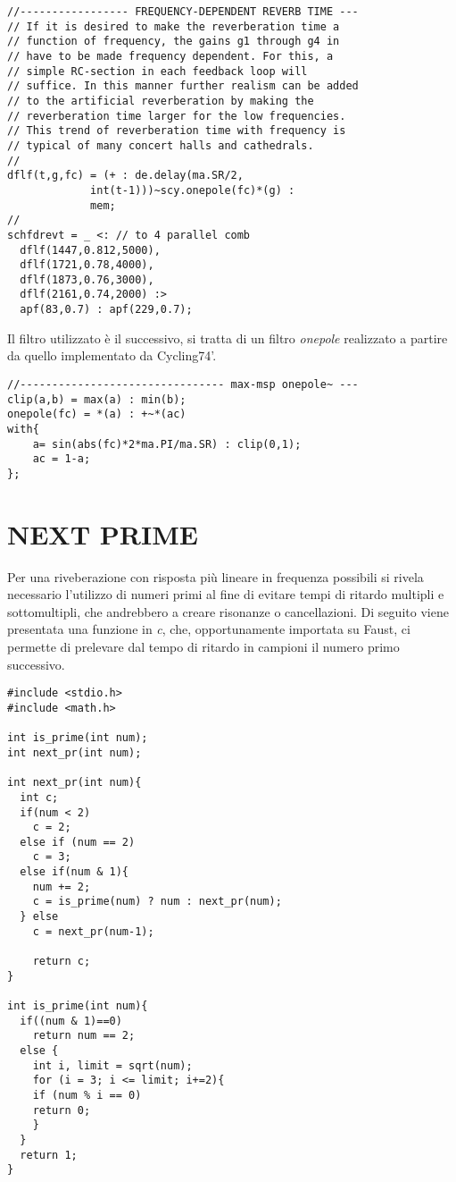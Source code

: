 \begin{lstlisting}
//----------------- FREQUENCY-DEPENDENT REVERB TIME ---
// If it is desired to make the reverberation time a
// function of frequency, the gains g1 through g4 in
// have to be made frequency dependent. For this, a
// simple RC-section in each feedback loop will
// suffice. In this manner further realism can be added
// to the artificial reverberation by making the
// reverberation time larger for the low frequencies.
// This trend of reverberation time with frequency is
// typical of many concert halls and cathedrals.
//
dflf(t,g,fc) = (+ : de.delay(ma.SR/2,
             int(t-1)))~scy.onepole(fc)*(g) :
             mem;
//
schfdrevt = _ <: // to 4 parallel comb
  dflf(1447,0.812,5000),
  dflf(1721,0.78,4000),
  dflf(1873,0.76,3000),
  dflf(2161,0.74,2000) :>
  apf(83,0.7) : apf(229,0.7);
\end{lstlisting}

Il filtro utilizzato è il successivo, si tratta di un filtro \textit{onepole}
realizzato a partire da quello implementato da Cycling74'.

\begin{lstlisting}
//-------------------------------- max-msp onepole~ ---
clip(a,b) = max(a) : min(b);
onepole(fc) = *(a) : +~*(ac)
with{
    a= sin(abs(fc)*2*ma.PI/ma.SR) : clip(0,1);
    ac = 1-a;
};
\end{lstlisting}

\section*{NEXT PRIME}

Per una riveberazione con risposta più lineare in frequenza possibili
si rivela necessario l'utilizzo di numeri primi al fine di evitare tempi di
ritardo multipli e sottomultipli, che andrebbero a creare risonanze o
cancellazioni. Di seguito viene presentata una funzione in \textit{c}, che,
opportunamente importata su Faust, ci permette di prelevare dal tempo di ritardo
in campioni il numero primo successivo.

\begin{lstlisting}
#include <stdio.h>
#include <math.h>

int is_prime(int num);
int next_pr(int num);

int next_pr(int num){
  int c;
  if(num < 2)
    c = 2;
  else if (num == 2)
    c = 3;
  else if(num & 1){
    num += 2;
    c = is_prime(num) ? num : next_pr(num);
  } else
    c = next_pr(num-1);

    return c;
}

int is_prime(int num){
  if((num & 1)==0)
    return num == 2;
  else {
    int i, limit = sqrt(num);
    for (i = 3; i <= limit; i+=2){
    if (num % i == 0)
    return 0;
    }
  }
  return 1;
}
\end{lstlisting}

